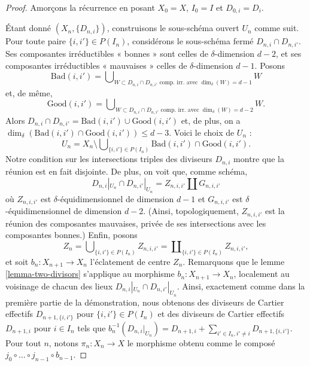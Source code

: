 \begin{proof}
\medskip\noindent
Amorçons la récurrence en posant $X_0 = X$,
$I_0 = I$ et $D_{0, i} = D_i$.

\medskip\noindent
Étant donné $(X_n, \{D_{n, i}\})$, construisons le sous-schéma ouvert
$U_n$ comme suit. Pour toute paire $\{i, i'\} \in P(I_n)$, considérons
le sous-schéma fermé $D_{n, i} \cap D_{n, i'}$. Ses composantes irréductibles
« bonnes » sont celles de $\delta$-dimension $d - 2$, et ses composantes irréductibles
« mauvaises » celles de $\delta$-dimension $d - 1$.
Posons
$$
\text{Bad}(i, i')
=
\bigcup\nolimits_{W \subset D_{n, i} \cap D_{n, i'}
\text{ comp.\ irr.\ avec }\dim_\delta(W) = d - 1} W
$$
et, de même,
$$
\text{Good}(i, i')
=
\bigcup\nolimits_{W \subset D_{n, i} \cap D_{n, i'}
\text{ comp.\ irr.\ avec }\dim_\delta(W) = d - 2} W.
$$
Alors $D_{n, i} \cap D_{n, i'} = \text{Bad}(i, i') \cup \text{Good}(i, i')$
et, de plus, on a
$\dim_\delta(\text{Bad}(i, i') \cap \text{Good}(i, i')) \leq d - 3$.
Voici le choix de $U_n$ :
$$
U_n
=
X_n
\setminus
\bigcup\nolimits_{\{i, i'\} \in P(I_n)}
\text{Bad}(i, i') \cap \text{Good}(i, i').
$$
Notre condition sur les intersections triples des diviseurs $D_{n, i}$
montre que la réunion est en fait disjointe. De plus,
on voit que, comme schéma,
$$
D_{n, i}|_{U_n} \cap D_{n, i'}|_{U_n}
=
Z_{n, i, i'} \amalg G_{n, i, i'}
$$
où $Z_{n, i, i'}$ est $\delta$-équidimensionnel de dimension $d - 1$
et $G_{n, i, i'}$ est $\delta$-équidimensionnel de dimension $d - 2$.
(Ainsi, topologiquement, $Z_{n, i, i'}$ est la réunion des composantes mauvaises,
privée de ses intersections avec les composantes bonnes.) Enfin, posons
$$
Z_n =
\bigcup\nolimits_{\{i, i'\} \in P(I_n)} Z_{n, i, i'} =
\coprod\nolimits_{\{i, i'\} \in P(I_n)} Z_{n, i, i'},
$$
et soit $b_n : X_{n + 1} \to X_n$ l'éclatement de centre $Z_n$.
Remarquons que le lemme \ref{lemma-two-divisors}
s'applique au morphisme $b_n : X_{n + 1} \to X_n$, localement au voisinage
de chacun des lieux $D_{n, i}|_{U_n} \cap D_{n, i'}|_{U_n}$. Ainsi,
exactement comme dans la première partie de la démonstration, nous obtenons des diviseurs de
Cartier effectifs $D_{n + 1, \{i, i'\}}$ pour $\{i, i'\} \in P(I_n)$
et des diviseurs de Cartier effectifs $D_{n + 1, i}$ pour $i \in I_n$
tels que
$b_n^{-1}(D_{n, i}|_{U_n}) = D_{n + 1, i} +
\sum\nolimits_{i' \in I_n, i' \not = i} D_{n + 1, \{i, i'\}}$.
Pour tout $n$, notons $\pi_n : X_n \to X$ le morphisme obtenu
comme le composé $j_0 \circ \ldots \circ j_{n - 1} \circ b_{n - 1}$.


\end{proof}
